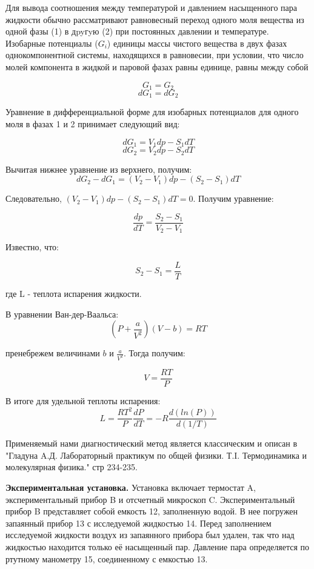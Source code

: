 \documentclass[a4paper,10pt]{article} %
\begin{document}
Для вывода соотношения между температурой и давлением насыщенного пара жидкости обычно рассматривают равновесный 
переход одного моля вещества из одной фазы (1) в дpyгyю (2) при постоянных давлении и температуре. Изобарные 
потенциалы ($G_i$) единицы массы чистого вещества в двух фазах однокомпонентной системы, находящихся в равновесии, 
при условии, что число молей компонента в жидкой и паровой фазах равны единице, равны между собой

\[G_1 = G_2\]
\[dG_1 = dG_2\]

Уравнение в дифференциальной форме для  изобарных потенциалов для одного моля в фазах 1 и 2 принимает следующий вид:

\[dG_1 = V_1dp - S_1dT\]
\[dG_2 = V_2dp - S_2dT\]

Вычитая нижнее уравнение из верхнего, получим:
\[dG_2 - dG_1 = (V_2-V_1)dp - (S_2-S_1)dT \]

Следовательно, $(V_2-V_1)dp - (S_2 - S_1)dT = 0$.
Получим уравнение:

\[\frac{dp}{dT} = \frac{S_2 - S_1}{V_2-V_1}\]

Известно, что:

\[S_2 - S_1 = \frac{L}{T}\]

где L - теплота испарения жидкости.

В уравнении Ван-дер-Ваальса:
\[(P+\frac{a}{V^2})(V-b) = RT\]

пренебрежем величинами $b$ и $\frac{a}{V^2}$. Тогда получим:

\[ V = \frac{RT}{P} \]

В итоге для удельной теплоты испарения: 
\[L = \frac{RT^2}{P}\frac{dP}{dT} = -R\frac{d(ln(P))}{d(1/T)}\]



Применяемый нами диагностический метод является классическим и описан в "Гладуна A.Д. Лабораторный практикум 
по общей физики. Т.I. Термодинамика и молекулярная физика." стр 234-235.



\medskip

\textbf{Экспериментальная установка.}
Установка включает термостат A, экспериментальный прибор B и отсчетный микроскоп C. Экспериментальный прибор B 
представляет собой емкость 12, заполненную водой. В нее погружен запаянный прибор 13 с исследуемой жидкостью 14. 
Перед заполнением исследуемой жидкости воздух из запаянного прибора был удален, так что над жидкостью находится 
только её насыщенный пар. Давление пара определяется по ртутному манометру 15, соединенному с емкостью 13.
\end{document}
